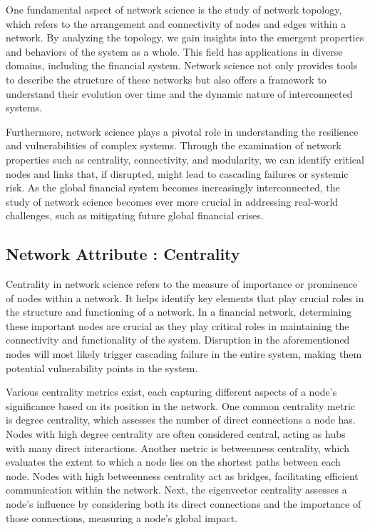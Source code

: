 \documentclass[a4paper,11pt]{article}
\begin{document}
One fundamental aspect of network science is the study of network topology, which refers to the arrangement and connectivity of nodes and edges within a network. By analyzing the topology, we gain insights into the emergent properties and behaviors of the system as a whole. This field has applications in diverse domains, including the financial system. Network science not only provides tools to describe the structure of these networks but also offers a framework to understand their evolution over time and the dynamic nature of interconnected systems.

Furthermore, network science plays a pivotal role in understanding the resilience and vulnerabilities of complex systems. Through the examination of network properties such as centrality, connectivity, and modularity, we can identify critical nodes and links that, if disrupted, might lead to cascading failures or systemic risk. As the global financial system becomes increasingly interconnected, the study of network science becomes ever more crucial in addressing real-world challenges, such as mitigating future global financial crises.

\subsection{Network Attribute : Centrality}
Centrality in network science refers to the measure of importance or prominence of nodes within a network. It helps identify key elements that play crucial roles in the structure and functioning of a network. In a financial network, determining these important nodes are crucial as they play critical roles in maintaining the connectivity and functionality of the system. Disruption in the aforementioned nodes will most likely trigger cascading failure in the entire system, making them potential vulnerability points in the system.

Various centrality metrics exist, each capturing different aspects of a node’s significance based on its position in the network. One common centrality metric is degree centrality, which assesses the number of direct connections a node has. Nodes with high degree centrality are often considered central, acting as hubs with many direct interactions. Another metric is betweenness centrality, which evaluates the extent to which a node lies on the shortest paths between each  node. Nodes with high betweenness centrality act as bridges, facilitating efficient communication within the network. Next, the eigenvector centrality assesses a node’s influence by considering both its direct connections and the importance of those connections, measuring a node’s global impact.
\end{document}
